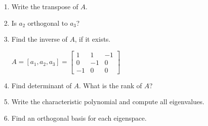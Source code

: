 \documentclass[11pt]{amsart}
\begin{document}
\begin{enumerate}

\item Write the transpose of $A$.
\vspace{.5in}\vspace{.5in}



\item Is $a_2$ orthogonal to $a_3$?
\vspace{.5in}\vspace{.5in}
\vspace{.5in}



\item Find the inverse of $A$, if it exists.
\vspace{.5in}\vspace{.5in}
\vspace{.5in}\vspace{.5in}
\vspace{.5in}
\vspace{.5in}


\newpage

$A = [a_1, a_2, a_3] = 
\begin{bmatrix}
1 & 1 & -1\\
0 & -1 & 0\\
-1 & 0 & 0 
\end{bmatrix}
$

\hfill

\item Find determinant of $A$. What is the rank of $A$?
\vspace{.5in}\vspace{.5in}
\vspace{.5in}\vspace{.5in}




\item Write the characteristic polynomial and compute all eigenvalues.
\vspace{.5in}\vspace{.5in}
\vspace{.5in}\vspace{.5in}



\item Find an orthogonal basis for each eigenspace.
\vspace{.5in}\vspace{.5in}\vspace{.5in}\vspace{.5in}\vspace{.5in}\vspace{.5in}
\vspace{.5in}\vspace{.5in}


\end{enumerate}
\end{document}
